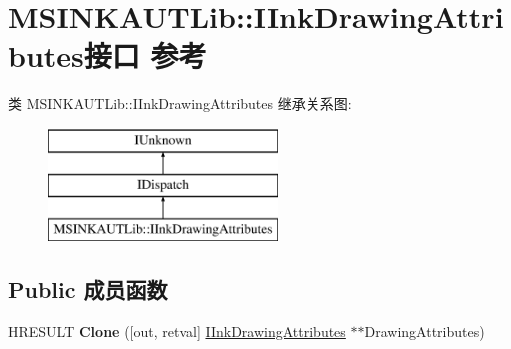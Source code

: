 \hypertarget{interface_m_s_i_n_k_a_u_t_lib_1_1_i_ink_drawing_attributes}{}\section{M\+S\+I\+N\+K\+A\+U\+T\+Lib\+:\+:I\+Ink\+Drawing\+Attributes接口 参考}
\label{interface_m_s_i_n_k_a_u_t_lib_1_1_i_ink_drawing_attributes}
类 M\+S\+I\+N\+K\+A\+U\+T\+Lib\+:\+:I\+Ink\+Drawing\+Attributes 继承关系图\+:\begin{figure}[H]
\begin{center}
\leavevmode
\includegraphics[height=3.000000cm]{interface_m_s_i_n_k_a_u_t_lib_1_1_i_ink_drawing_attributes}
\end{center}
\end{figure}
\subsection*{Public 成员函数}
\begin{DoxyCompactItemize}
\item 
\mbox{\label{interface_m_s_i_n_k_a_u_t_lib_1_1_i_ink_drawing_attributes_a79d2cf4de0712e369574cf56b881531d}} 
H\+R\+E\+S\+U\+LT {\bfseries Clone} (\mbox{[}out, retval\mbox{]} \hyperlink{interface_m_s_i_n_k_a_u_t_lib_1_1_i_ink_drawing_attributes}{I\+Ink\+Drawing\+Attributes} $\ast$$\ast$Drawing\+Attributes)
\end{DoxyCompactItemize}
